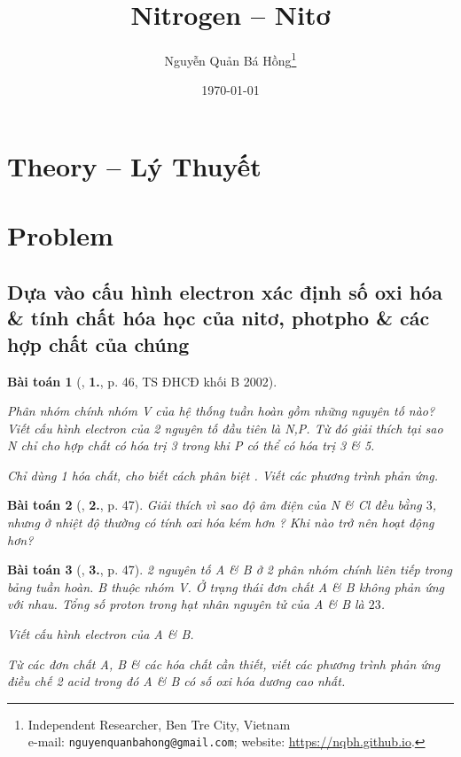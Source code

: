 \documentclass{article}
\title{Nitrogen -- Nitơ}
\author{Nguyễn Quản Bá Hồng\footnote{Independent Researcher, Ben Tre City, Vietnam\\e-mail: \texttt{nguyenquanbahong@gmail.com}; website: \url{https://nqbh.github.io}.}}
\date{\today}
\numberwithin{equation}{section}
\newtheorem{baitoan}{Bài toán}[section]
\begin{document}
\maketitle
\begin{abstract}
	
\end{abstract}
\setcounter{secnumdepth}{4}
\setcounter{tocdepth}{3}
\tableofcontents


\section{Theory -- Lý Thuyết}
\cite[pp. 38--]{An_Hoa_Hoc_nang_cao_11_2020}

\section{Problem}

\subsection{Dựa vào cấu hình electron xác định số oxi hóa \& tính chất hóa học của nitơ, photpho \& các hợp chất của chúng}

\begin{baitoan}[\cite{An_Hoa_Hoc_nang_cao_11_2020}, \textbf{1.}, p. 46, TS ĐHCĐ khối B 2002]
	\begin{enumerate*}
		\item[(a)] Phân nhóm chính nhóm V của hệ thống tuần hoàn gồm những nguyên tố nào? Viết cấu hình electron của 2 nguyên tố đầu tiên là \emph{N,P}. Từ đó giải thích tại sao \emph{N} chỉ cho hợp chất có hóa trị 3 trong khi \emph{P} có thể có hóa trị 3 \& 5.
		\item[(b)] Chỉ dùng 1 hóa chất, cho biết cách phân biệt \emph{}. Viết các phương trình phản ứng.
	\end{enumerate*}
\end{baitoan}

\begin{baitoan}[\cite{An_Hoa_Hoc_nang_cao_11_2020}, \textbf{2.}, p. 47]
	Giải thích vì sao độ âm điện của \emph{N} \& \emph{Cl} đều bằng $3$, nhưng ở nhiệt độ thường \emph{} có tính oxi hóa kém hơn \emph{}? Khi nào \emph{} trở nên hoạt động hơn?
\end{baitoan}

\begin{baitoan}[\cite{An_Hoa_Hoc_nang_cao_11_2020}, \textbf{3.}, p. 47]
	2 nguyên tố A \& B ở 2 phân nhóm chính liên tiếp trong bảng tuần hoàn. B thuộc nhóm V. Ở trạng thái đơn chất A \& B không phản ứng với nhau. Tổng số proton trong hạt nhân nguyên tử của A \& B là $23$.
	\begin{enumerate*}
		\item[(a)] Viết cấu hình electron của A \& B.
		\item[(b)] Từ các đơn chất A, B \& các hóa chất cần thiết, viết các phương trình phản ứng điều chế 2 acid trong đó A \& B có số oxi hóa dương cao nhất.
	\end{enumerate*}
\end{baitoan}
\end{document}
